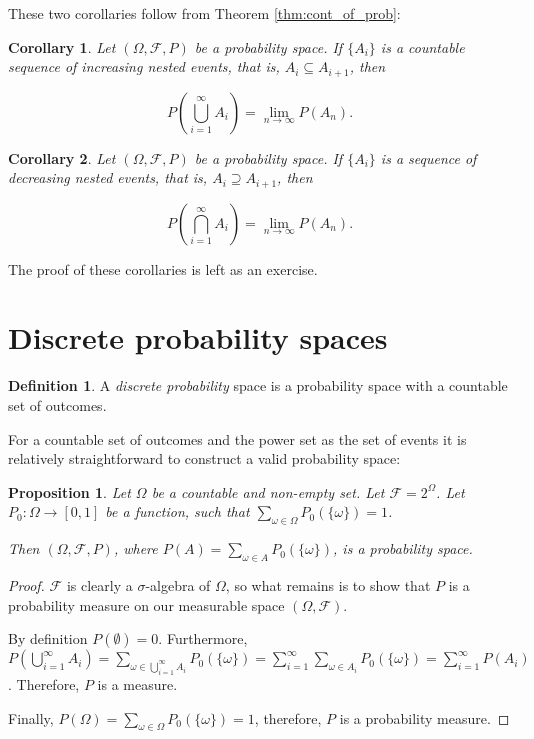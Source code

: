 \documentclass{book}
\theoremstyle{plain}%
\newtheorem{corollary}{Corollary}[section]
\newtheorem{proposition}{Proposition}[section]
\theoremstyle{definition}
\newtheorem{definition}{Definition}[section]
\newlength{\arrow}
\begin{document}
These two corollaries follow from Theorem \ref{thm:cont_of_prob}:

\begin{corollary}
Let $(\Omega, \mathcal{F}, P)$ be a probability space. If $\{A_i\}$ is a countable sequence of increasing nested events, that is, $A_i \subseteq A_{i+1}$, then

$$P(\bigcup_{i=1}^\infty A_i) = \displaystyle\lim_{n\rightarrow\infty} P(A_n).$$\label{cor:001}
\end{corollary}

\begin{corollary}
Let $(\Omega, \mathcal{F}, P)$ be a probability space. If $\{A_i\}$ is a sequence of decreasing nested events, that is, $A_{i} \supseteq A_{i+1}$, then

$$P(\bigcap_{i=1}^\infty A_i) = \displaystyle\lim_{n\rightarrow\infty} P(A_n).$$\label{cor:002}
\end{corollary}

The proof of these corollaries is left as an exercise.

\section{Discrete probability spaces}

\begin{definition}
A \emph{discrete probability} space is a probability space with a countable set of outcomes.
\end{definition}

For a countable set of outcomes and the power set as the set of events it is relatively straightforward to construct a valid probability space:

\begin{proposition}
Let $\Omega$ be a countable and non-empty set. Let $\mathcal{F} = 2^\Omega$. Let $P_0: \Omega \rightarrow [0,1]$ be a function, such that $\sum_{\omega \in \Omega} P_0(\{\omega\}) = 1$.

Then $(\Omega, \mathcal{F}, P)$, where $P(A) = \sum_{\omega \in A} P_0(\{\omega\})$, is a probability space.\label{prop:discrete_prob_space}
\end{proposition}

\begin{proof}
$\mathcal{F}$ is clearly a $\sigma$-algebra of $\Omega$, so what remains is to show that $P$ is a probability measure on our measurable space $(\Omega, \mathcal{F})$.

By definition $P(\emptyset) = 0$. Furthermore, $P(\bigcup_{i=1}^\infty A_i) = \sum_{\omega \in \bigcup_{i=1}^\infty A_i} P_0(\{\omega\}) = \sum_{i=1}^\infty \sum_{\omega \in A_i} P_0(\{\omega\}) = \sum_{i=1}^\infty P(A_i)$. Therefore, $P$ is a measure.

Finally, $P(\Omega) = \sum_{\omega \in \Omega} P_0(\{\omega\}) = 1$, therefore, $P$ is a probability measure.
\end{proof}
\end{document}
